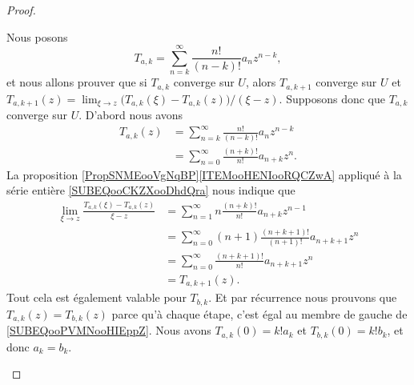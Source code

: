 \begin{proof}
\begin{subproof}
		\spitem[La récurrence]
		Nous posons
		\begin{equation}
			T_{a,k}=\sum_{n=k}^{\infty}\frac{ n! }{ (n-k)! }a_{n}z^{n-k},
		\end{equation}
		et nous allons prouver que si  \( T_{a,k}\) converge sur \( U\), alors \( T_{a,k+1}\) converge sur \( U\) et \( T_{a,k+1}(z)=\lim_{\xi\to z} \big( T_{a,k}(\xi)-T_{a,k}(z) \big)/(\xi-z)   \). Supposons donc que \( T_{a,k}\) converge sur \( U\). D'abord nous avons
		\begin{subequations}
			\begin{align}
				T_{a,k}(z) & =\sum_{n=k}^{\infty}\frac{ n! }{ (n-k)! }a_nz^{n-k}                               \\
				           & =\sum_{n=0}^{\infty}\frac{ (n+k)! }{ n! }a_{n+k}z^n.		\label{SUBEQooCKZXooDhdQra}
			\end{align}
		\end{subequations}
		La proposition \ref{PropSNMEooVgNqBP}\ref{ITEMooHENIooRQCZwA} appliqué à la série entière \eqref{SUBEQooCKZXooDhdQra} nous indique que
		\begin{subequations}
			\begin{align}
				\lim_{\xi\to z}\frac{ T_{a,k}(\xi)-T_{a,k}(z) }{ \xi-z } & =\sum_{n=1}^{\infty}n\frac{ (n+k)! }{ n! }a_{n+k}z^{n-1}     \label{SUBEQooPVMNooHIEppZ} \\
				                                                         & =\sum_{n=0}^{\infty}(n+1)\frac{(n+k+1)!}{ (n+1)! }a_{n+k+1}z^n                           \\
				                                                         & =\sum_{n=0}^{\infty}\frac{ (n+k+1)! }{ n! }a_{n+k+1}z^n                                  \\
				                                                         & =T_{a,k+1}(z).
			\end{align}
		\end{subequations}
		Tout cela est également valable pour \( T_{b,k}\). Et par récurrence nous prouvons que \( T_{a,k}(z)=T_{b,k}(z)\) parce qu'à chaque étape, c'est égal au membre de gauche de \eqref{SUBEQooPVMNooHIEppZ}. Nous avons \( T_{a,k}(0)=k!a_k\) et \( T_{b,k}(0)=k!b_k\), et donc \( a_k=b_k\).
	\end{subproof}
\end{proof}


